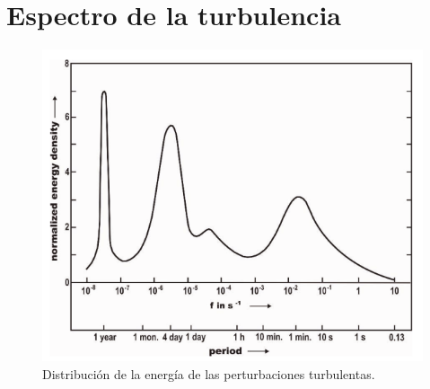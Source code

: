 \documentclass[openany]{book}
\begin{document}
\section{Espectro de la turbulencia}
\begin{figure}[htbp]
    \centering
    \includegraphics[width=\linewidth]{img/turbulence-spectrum.png}    
    \caption{Distribución de la energía de las perturbaciones turbulentas.}
    \label{fig:turbulence-spectrum} 
\end{figure}
\end{document}
